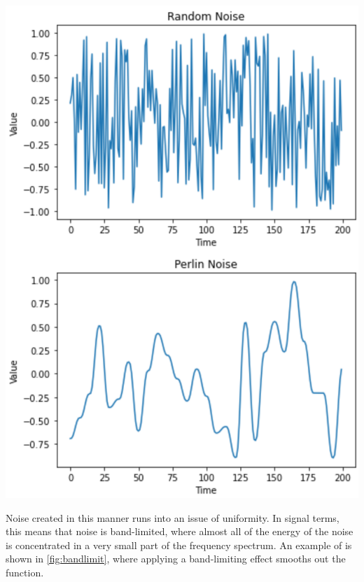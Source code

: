 \documentclass[10pt]{report}
\begin{document}
			\begin{minipage}{\textwidth}
				\centering
				\includegraphics[scale=0.3]{perlinnoise}
				\label{fig:perlinnoise}
			\end{minipage}
		
			Noise created in this manner runs into an issue of uniformity. In signal terms, this means that noise is band-limited, where almost all of the energy of the noise is concentrated in a very small part of the frequency spectrum. An example of is shown in \autoref{fig:bandlimit}, where applying a band-limiting effect smooths out the function.
			
\end{document}
